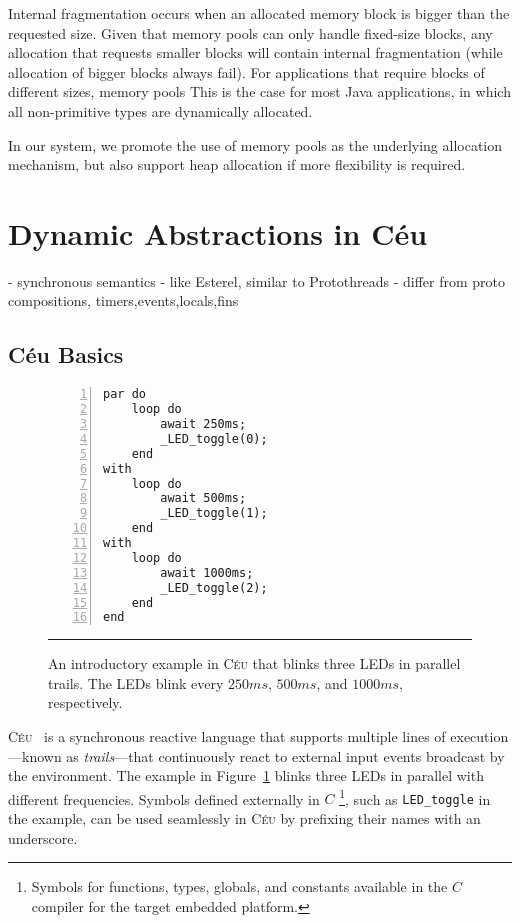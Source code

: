 \documentclass{sig-alternate-ipsn13}
\newcommand{\CEU}{\textsc{C\'{e}u}\xspace}
\newcommand{\code}[1] {{\small{\texttt{#1}}}}
\begin{document}
Internal fragmentation occurs when an allocated memory block is bigger than the 
requested size.
Given that memory pools can only handle fixed-size blocks, any allocation that 
requests smaller blocks will contain internal fragmentation (while allocation 
of bigger blocks always fail).
For applications that require blocks of different sizes, memory pools
This is the case for most Java applications, in which all non-primitive types 
are dynamically allocated.

In our system, we promote the use of memory pools as the underlying allocation 
mechanism, but also support heap allocation if more flexibility is required.

\section{Dynamic Abstractions in C\'eu}

- synchronous semantics
- like Esterel, similar to Protothreads
- differ from proto compositions, timers,events,locals,fins

\subsection{C\'eu Basics}

\begin{comment}
- deterministic and bounded execution
- shared memory concurrency
- integration with C
- locals and finalization
- first-class timers
- internal events
\end{comment}

\begin{figure}[t]
\begin{lstlisting}[numbers=left,xleftmargin=3em]
par do
    loop do
        await 250ms;
        _LED_toggle(0);
    end
with
    loop do
        await 500ms;
        _LED_toggle(1);
    end
with
    loop do
        await 1000ms;
        _LED_toggle(2);
    end
end
\end{lstlisting}
\rule{8.6cm}{0.37pt}
\caption{
    An introductory example in \CEU that blinks three LEDs in parallel trails.
    The LEDs blink every $250ms$, $500ms$, and $1000ms$, respectively.
    \label{lst.blink}
}
\end{figure}

\CEU~\cite{ceu.sensys13} is a synchronous reactive language that supports 
multiple lines of execution---known as \emph{trails}---that continuously react 
to external input events broadcast by the environment.
%
The example in Figure~\ref{lst.blink} blinks three LEDs in parallel with 
different frequencies.
%
Symbols defined externally in $C$%
\footnote{Symbols for functions, types, globals, and constants available in the 
$C$ compiler for the target embedded platform.
}, such as \code{LED\_toggle} in the example, can be used seamlessly in \CEU by 
prefixing their names with an underscore.
\end{document}
